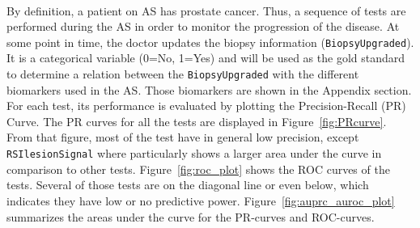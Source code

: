 \documentclass[]{article}
\begin{document}
\begin{minipage}{\linewidth}
\label{fig:correlations}     
\end{minipage} \\

\newpage

\noindent By definition, a patient on AS has prostate cancer. Thus, a sequence of tests are performed during the
AS in order to monitor the progression of the disease. At some point in time, the doctor updates the biopsy information
({\verb|BiopsyUpgraded|}). It is a categorical variable (0=No, 1=Yes) and will be used as the gold standard 
to determine a relation between the {\verb|BiopsyUpgraded|} with the different biomarkers used in the AS. 
Those biomarkers are shown in the Appendix section. \\

\noindent For each test, its performance is evaluated by plotting the Precision-Recall (PR) Curve. 
The PR curves for all the tests are displayed in Figure~\ref{fig:PRcurve}. From that figure, most of the test 
have in general low precision, except \verb|RSIlesionSignal| where particularly shows a larger area under 
the curve in comparison to other tests. Figure~\ref{fig:roc_plot} shows the ROC curves of the tests. Several of
those tests are on the diagonal line or even below, which indicates they have low or no predictive power. 
Figure~\ref{fig:auprc_auroc_plot} summarizes the areas under the curve for the PR-curves and ROC-curves.\\
\end{document}
